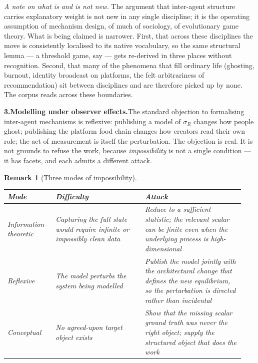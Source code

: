 \documentclass[11pt]{article}
\newtheorem{remark}{Remark}
\begin{document}
\medskip\noindent\textit{A note on what is and is not new.} The argument that
inter-agent structure carries explanatory weight is not new in any single
discipline; it is the operating assumption of mechanism design, of much of
sociology, of evolutionary game theory. What is being claimed is narrower.
First, that across these disciplines the move is consistently localised to
its native vocabulary, so the same structural lemma --- a threshold game,
say --- gets re-derived in three places without recognition. Second, that
many of the phenomena that fill ordinary life (ghosting, burnout, identity
broadcast on platforms, the felt arbitrariness of recommendation) sit
between disciplines and are therefore picked up by none. The corpus reads
across these boundaries.

\bigskip\noindent\textbf{3.\quad Modelling under observer effects.}\quad The
standard objection to formalising inter-agent mechanisms is reflexive:
publishing a model of $\sigma_R$ changes how people ghost; publishing the
platform food chain changes how creators read their own role; the act of
measurement is itself the perturbation. The objection is real. It is not
grounds to refuse the work, because \textit{impossibility} is not a single
condition --- it has facets, and each admits a different attack.

\begin{remark}[Three modes of impossibility]
\hfill\\[0.3em]
\renewcommand{\arraystretch}{1.25}
\begin{tabular}{@{}p{0.18\linewidth}p{0.36\linewidth}p{0.40\linewidth}@{}}
\toprule
\textbf{Mode} & \textbf{Difficulty} & \textbf{Attack} \\
\midrule
Information-theoretic
  & Capturing the full state would require infinite or impossibly clean data
  & Reduce to a sufficient statistic; the relevant scalar can be finite even
    when the underlying process is high-dimensional \\
Reflexive
  & The model perturbs the system being modelled
  & Publish the model jointly with the architectural change that defines
    the new equilibrium, so the perturbation is directed rather than
    incidental \\
Conceptual
  & No agreed-upon target object exists
  & Show that the missing scalar ground truth was never the right object;
    supply the structured object that does the work \\
\bottomrule
\end{tabular}
\end{remark}
\end{document}
